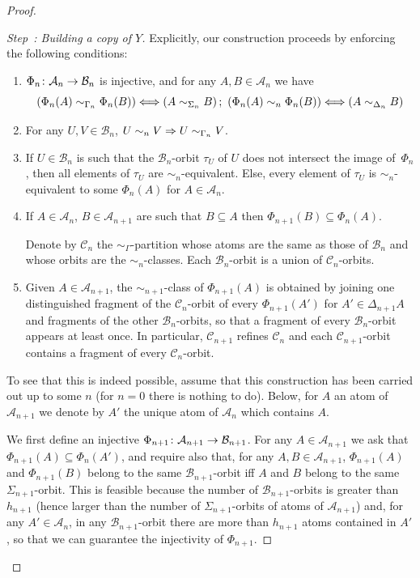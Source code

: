 \documentclass[10pt,a4paper]{article}
\theoremstyle{definition}
\newcommand{\mcA}{\mathcal{A}}
\newcommand{\mcB}{\mathcal{B}}
\newcommand{\mcC}{\mathcal{C}}
\newcounter{setofstep}
\newcounter{step}[setofstep]
\newenvironment{step}[1][]{\refstepcounter{step}\begin{proof}[{Step~\thestep\if#1\empty\else: #1\fi}]}{\let\qed\relax\end{proof}}
\renewcommand*{\to}{\mathchoice{\longrightarrow}{\rightarrow}{\rightarrow}{\rightarrow}}
\newcommand*{\To}{\mathchoice{\Longrightarrow}{\Rightarrow}{\Rightarrow}{\Rightarrow}}
\let\oldLeftrightarrow\Leftrightarrow
\renewcommand*{\Leftrightarrow}{\mathchoice{\Longleftrightarrow}{\oldLeftrightarrow}{\oldLeftrightarrow}{\oldLeftrightarrow}}
\begin{document}
\begin{proof}
\begin{step}[{Building a copy of $Y$}]
\pagebreak
Explicitly, our construction proceeds by enforcing the following conditions:
\begin{enumerate}
\item $\Phi_n \colon \mcA_n \to \mcB_n$ is injective, and for any $A,B \in \mcA_n$ we have
\[
\left(\Phi_n(A) \sim_{\Gamma_n} \Phi_n(B)\right) \Leftrightarrow (A \sim_{\Sigma_n} B) \, ; \ \left(\Phi_n(A) \sim_n \Phi_n(B)\right) \Leftrightarrow (A \sim_{\Delta_n} B)
\]
\item For any $U,V \in \mcB_n$, $U \sim_n V \To U \sim_{\Gamma_n} V$.

\item If $U \in \mcB_{n}$ is such that the $\mcB_n$-orbit $\tau_U$ of $U$ does not intersect the image of~$\Phi_n$, then all elements of $\tau_U$ are $\sim_{n}$-equivalent. Else, every element of $\tau_U$ is $\sim_{n}$-equivalent to some $\Phi_{n}(A)$ for $A \in \mcA_{n}$.
\item If $A \in \mcA_n$, $B \in \mcA_{n+1}$ are such that $B \subseteq A$ then $\Phi_{n+1}(B) \subseteq \Phi_n(A)$.

Denote by $\mcC_n$ the $\sim_\Gamma$-partition whose atoms are the same as those of $\mcB_n$ and whose orbits are the $\sim_n$-classes. Each $\mcB_n$-orbit is a union of $\mcC_n$-orbits.

\item Given $A \in \mcA_{n+1}$, the $\sim_{n+1}$-class of $\Phi_{n+1}(A)$ is obtained by joining one distinguished fragment of the $\mcC_{n}$-orbit of every $\Phi_{n+1}(A')$ for $A' \in \Delta_{n+1}A$ and fragments of the other $\mcB_n$-orbits, so that a fragment of every $\mcB_n$-orbit appears at least once. In particular, $\mcC_{n+1}$ refines $\mcC_n$ and each $\mcC_{n+1}$-orbit contains a fragment of every $\mcC_n$-orbit.
\end{enumerate}

To see that this is indeed possible, assume that this construction has been carried out up to some $n$ (for $n=0$ there is nothing to do). Below, for $A$ an atom of $\mcA_{n+1}$ we denote by $A'$ the unique atom of $\mcA_n$ which contains $A$.

We first define an injective $\Phi_{n+1} \colon \mcA_{n+1} \to \mcB_{n+1}$. For any $A \in \mcA_{n+1}$ we ask that $\Phi_{n+1}(A) \subseteq \Phi_n(A')$, and require also that, for any $A,B \in \mcA_{n+1}$, $\Phi_{n+1}(A)$ and $\Phi_{n+1}(B)$ belong to the same $\mcB_{n+1}$-orbit iff $A$ and $B$ belong to the same $\Sigma_{n+1}$-orbit. This is feasible because the number of $\mcB_{n+1}$-orbits is greater than $h_{n+1}$ (hence larger than the number of $\Sigma_{n+1}$-orbits of atoms of $\mcA_{n+1}$) and, for any $A' \in \mcA_n$, in any $\mcB_{n+1}$-orbit there are more than $h_{n+1}$ atoms contained in $A'$, so that we can guarantee the injectivity of $\Phi_{n+1}$.


\end{step}
\end{proof}
\end{document}
